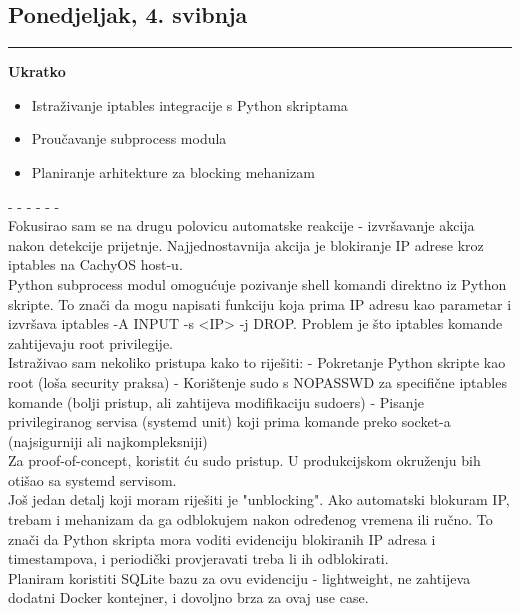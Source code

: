 \documentclass[12pt, a4paper]{article}
\newcommand{\dan}[1]{
    \subsection*{#1}
    \vspace{-0.5em} 
    \hrule \vspace{0.5em} 
}
\begin{document}
\dan{Ponedjeljak, 4. svibnja}
\textbf{Ukratko}
\begin{itemize}
    \item Istraživanje iptables integracije s Python skriptama
    \item Proučavanje subprocess modula
    \item Planiranje arhitekture za blocking mehanizam
\end{itemize}
- - - - - - \\
Fokusirao sam se na drugu polovicu automatske reakcije - izvršavanje akcija nakon detekcije prijetnje. Najjednostavnija akcija je blokiranje IP adrese kroz iptables na CachyOS host-u.
\\
Python subprocess modul omogućuje pozivanje shell komandi direktno iz Python skripte. To znači da mogu napisati funkciju koja prima IP adresu kao parametar i izvršava iptables -A INPUT -s <IP> -j DROP. Problem je što iptables komande zahtijevaju root privilegije.
\\
Istraživao sam nekoliko pristupa kako to riješiti:
- Pokretanje Python skripte kao root (loša security praksa)
- Korištenje sudo s NOPASSWD za specifične iptables komande (bolji pristup, ali zahtijeva modifikaciju sudoers)
- Pisanje privilegiranog servisa (systemd unit) koji prima komande preko socket-a (najsigurniji ali najkompleksniji)
\\
Za proof-of-concept, koristit ću sudo pristup. U produkcijskom okruženju bih otišao sa systemd servisom.
\\
Još jedan detalj koji moram riješiti je "unblocking". Ako automatski blokuram IP, trebam i mehanizam da ga odblokujem nakon određenog vremena ili ručno. To znači da Python skripta mora voditi evidenciju blokiranih IP adresa i timestampova, i periodički provjeravati treba li ih odblokirati.
\\
Planiram koristiti SQLite bazu za ovu evidenciju - lightweight, ne zahtijeva dodatni Docker kontejner, i dovoljno brza za ovaj use case.
\end{document}
